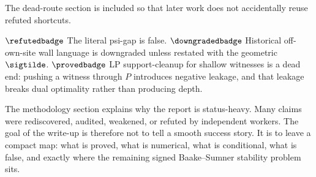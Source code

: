 The dead-route section is included so that later work does not accidentally
reuse refuted shortcuts.

\noindent\(\refutedbadge\) The literal psi-gap is false.  \(\downgradedbadge\)
Historical off-own-site wall language is downgraded unless restated with the
geometric \(\sigtilde\).  \(\provedbadge\) LP support-cleanup for shallow
witnesses is a dead end: pushing a witness through \(P\) introduces negative
leakage, and that leakage breaks dual optimality rather than producing depth.

The methodology section explains why the report is status-heavy.  Many claims
were rediscovered, audited, weakened, or refuted by independent workers.  The
goal of the write-up is therefore not to tell a smooth success story.  It is
to leave a compact map: what is proved, what is numerical, what is conditional,
what is false, and exactly where the remaining signed Baake--Sumner stability
problem sits.
